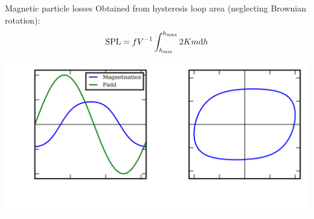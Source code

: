 \documentclass{sotonbeamer}
\begin{document}
\begin{frame}{Magnetic particle losses}
Obtained from hysteresis loop area (neglecting Brownian rotation):
\begin{equation*}
    \label{eq:sar_carrey}
    \textup{SPL} = fV^{-1} \int_{h_\textup{min}}^{h_\textup{max}} 2Km \textup{d}h
  \end{equation*}
  \begin{center}
    \includegraphics{figures/mt_and_mh.png}
  \end{center}
\end{frame}
\end{document}
